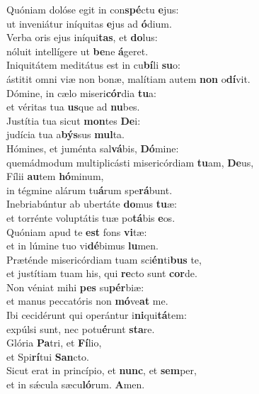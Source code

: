 \evenverse Quóniam dolóse egit in con\textbf{spé}ctu \textbf{e}jus:~\*\\
\evenverse ut inveniátur iníquitas \textbf{e}jus ad \textbf{ó}dium.\\
\oddverse Verba oris ejus iníqui\textbf{tas}, et \textbf{do}lus:~\*\\
\oddverse nóluit intellígere ut \textbf{be}ne \textbf{á}geret.\\
\evenverse Iniquitátem meditátus est in cu\textbf{bí}li \textbf{su}o:~\*\\
\evenverse ástitit omni viæ non bonæ, malítiam autem \textbf{non} o\textbf{dí}vit.\\
\oddverse Dómine, in cælo miseri\textbf{cór}dia \textbf{tu}a:~\*\\
\oddverse et véritas tua \textbf{us}que ad \textbf{nu}bes.\\
\evenverse Justítia tua sicut \textbf{mon}tes \textbf{De}i:~\*\\
\evenverse judícia tua a\textbf{býs}sus \textbf{mul}ta.\\
\oddverse Hómines, et juménta sal\textbf{vá}bis, \textbf{Dó}mine:~\*\\
\oddverse quemádmodum multiplicásti misericórdiam \textbf{tu}am, \textbf{De}us,\\
\evenverse Fílii \textbf{au}tem \textbf{hó}minum,~\*\\
\evenverse in tégmine alárum tu\textbf{á}rum spe\textbf{rá}bunt.\\
\oddverse Inebriabúntur ab ubertáte \textbf{do}mus \textbf{tu}æ:~\*\\
\oddverse et torrénte voluptátis tuæ po\textbf{tá}bis \textbf{e}os.\\
\evenverse Quóniam apud te \textbf{est} fons \textbf{vi}tæ:~\*\\
\evenverse et in lúmine tuo vi\textbf{dé}bimus \textbf{lu}men.\\
\oddverse Præténde misericórdiam tuam sci\textbf{én}ti\textbf{bus} te,~\*\\
\oddverse et justítiam tuam his, qui \textbf{re}cto sunt \textbf{cor}de.\\
\evenverse Non véniat mihi \textbf{pes} su\textbf{pér}biæ:~\*\\
\evenverse et manus peccatóris non \textbf{mó}ve\textbf{at} me.\\
\oddverse Ibi cecidérunt qui operántur i\textbf{ni}qui\textbf{tá}tem:~\*\\
\oddverse expúlsi sunt, nec potu\textbf{é}runt \textbf{sta}re.\\
\evenverse Glória \textbf{Pa}tri, et \textbf{Fí}lio,~\*\\
\evenverse et Spi\textbf{rí}tui \textbf{San}cto.\\
\oddverse Sicut erat in princípio, et \textbf{nunc}, et \textbf{sem}per,~\*\\
\oddverse et in sǽcula sæcu\textbf{ló}rum. \textbf{A}men.\\
